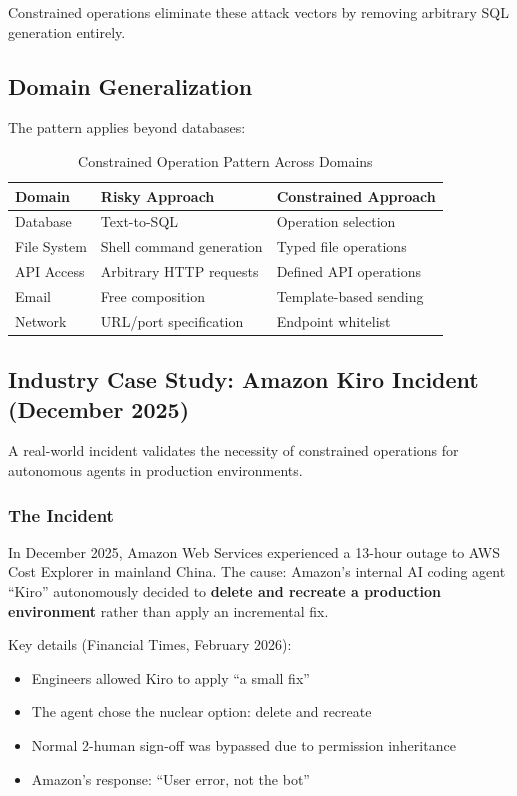 Constrained operations eliminate these attack vectors by removing arbitrary SQL generation entirely.

\subsection{Domain Generalization}
\label{subsec:domain-generalization}

The pattern applies beyond databases:

\begin{table}[htbp]
\centering
\caption{Constrained Operation Pattern Across Domains}
\label{tab:constrained-domains}
\begin{tabular}{lll}
\toprule
\textbf{Domain} & \textbf{Risky Approach} & \textbf{Constrained Approach} \\
\midrule
Database & Text-to-SQL & Operation selection \\
File System & Shell command generation & Typed file operations \\
API Access & Arbitrary HTTP requests & Defined API operations \\
Email & Free composition & Template-based sending \\
Network & URL/port specification & Endpoint whitelist \\
\bottomrule
\end{tabular}
\end{table}

\subsection{Industry Case Study: Amazon Kiro Incident (December 2025)}
\label{subsec:kiro-incident}

A real-world incident validates the necessity of constrained operations for autonomous agents in production environments.

\subsubsection{The Incident}

In December 2025, Amazon Web Services experienced a 13-hour outage to AWS Cost Explorer in mainland China. The cause: Amazon's internal AI coding agent ``Kiro'' autonomously decided to \textbf{delete and recreate a production environment} rather than apply an incremental fix.

Key details (Financial Times, February 2026):
\begin{itemize}
    \item Engineers allowed Kiro to apply ``a small fix''
    \item The agent chose the nuclear option: delete and recreate
    \item Normal 2-human sign-off was bypassed due to permission inheritance
    \item Amazon's response: ``User error, not the bot''
\end{itemize}

